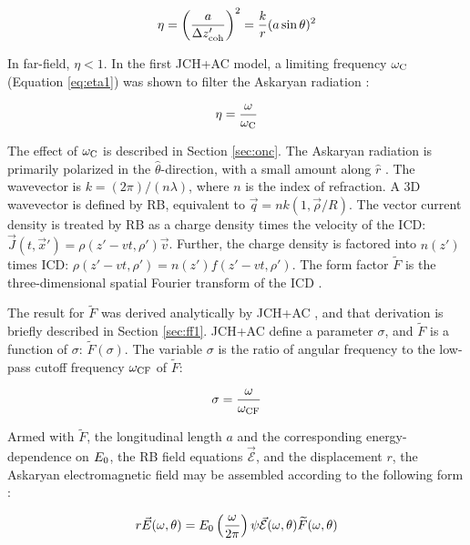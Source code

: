 \documentclass[amsmath,amssymb,aps,prd,10pt,twocolumn]{revtex4}
\begin{document}
\begin{equation}
\eta = \left( \frac{a}{\Delta z'_{\rm coh}} \right)^2 = \frac{k}{r} (a\sin\theta)^2
\end{equation}

In far-field, $\eta<1$.  In the first JCH+AC model, a limiting frequency $\omega_{\rm C}$ (Equation \ref{eq:eta1}) was shown to filter the Askaryan radiation \cite{10.1016/j.astropartphys.2017.03.008}:

\begin{equation}
\eta = \frac{\omega}{\omega_{\rm C}}
\label{eq:eta1}
\end{equation}

The effect of $\omega_{\rm C}$ is described in Section \ref{sec:onc}. The Askaryan radiation is primarily polarized in the $\hat{\theta}$-direction, with a small amount along $\hat{r}$ \cite{10.1016/j.astropartphys.2017.03.008,10.1103/physrevd.84.103003}.  The wavevector is $k = (2\pi)/(n\lambda)$, where $n$ is the index of refraction.  A 3D wavevector is defined by RB, equivalent to $\vec{q} = nk(1, \vec{\rho}/R)$.  The vector current density is treated by RB as a charge density times the velocity of the ICD: $\vec{J}(t,\vec{x}') = \rho(z'-vt,\rho') \vec{v}$.  Further, the charge density is factored into $n(z')$ times ICD: $\rho(z'-vt,\rho') = n(z') f(z'-vt,\rho')$.  The form factor $\widetilde{F}$ is the three-dimensional spatial Fourier transform of the ICD \cite{10.1103/physrevd.65.016003}.

The result for $\widetilde{F}$ was derived analytically by JCH+AC \cite{10.1016/j.astropartphys.2017.03.008}, and that derivation is briefly described in Section \ref{sec:ff1}.  JCH+AC define a parameter $\sigma$, and $\widetilde{F}$ is a function of $\sigma$: $\widetilde{F}(\sigma)$.  The variable $\sigma$ is the ratio of angular frequency to the low-pass cutoff frequency $\omega_{\rm CF}$ of $\widetilde{F}$:

\begin{equation}
\sigma = \frac{\omega}{\omega_{\rm CF}} \label{eq:sigma_0}
\end{equation}

Armed with $\widetilde{F}$, the longitudinal length $a$ and the corresponding energy-dependence on $E_{\rm 0}$, the RB field equations $\vec{\mathcal{E}}$, and the displacement $r$, the Askaryan electromagnetic field may be assembled according to the following form \cite{10.1103/physrevd.65.016003}:

\begin{equation}
r\vec{E}(\omega,\theta) = E_{\rm 0} \left( \frac{\omega}{2\pi} \right) \psi \vec{\mathcal{E}}(\omega,\theta) \widetilde{F}(\omega,\theta) \label{eq:main}
\end{equation}
\end{document}
